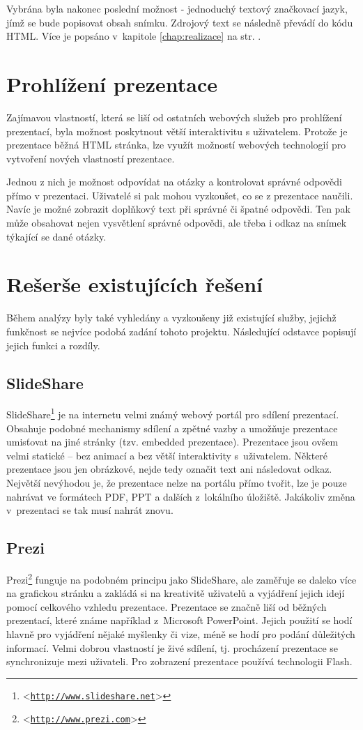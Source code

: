 \documentclass[11pt,twoside,a4paper]{book}
\let\oldUrl\url									%
\renewcommand\url[1]{<\texttt{\oldUrl{#1}}>}
\begin{document}
Vybrána byla nakonec poslední možnost - jednoduchý textový značkovací jazyk, jímž se bude popisovat obsah snímku. Zdrojový text se následně převádí do kódu HTML. Více je popsáno v~kapitole \ref{chap:realizace}  na str. \pageref{chap:realizace}.

\section{Prohlížení prezentace}
Zajímavou vlastností, která se liší od ostatních webových služeb pro prohlížení prezentací, byla možnost poskytnout větší interaktivitu s uživatelem. Protože je prezentace běžná HTML stránka, lze využít možností webových technologií pro vytvoření nových vlastností prezentace.

Jednou z nich je možnost odpovídat na otázky a kontrolovat správné odpovědi přímo v prezentaci. Uživatelé si pak mohou vyzkoušet, co se z prezentace naučili. Navíc je možné zobrazit doplňkový text při správné či špatné odpovědi. Ten pak může obsahovat nejen vysvětlení správné odpovědi, ale třeba i odkaz na snímek týkající se dané otázky.


\section{Rešerše existujících řešení} \label{chap:existujiciSystemy}
Během analýzy byly také vyhledány a vyzkoušeny již existující služby, jejichž funkčnost se nejvíce podobá zadání tohoto projektu. Následující odstavce popisují jejich funkci a rozdíly.


\subsection{SlideShare}
SlideShare\footnote{\url{http://www.slideshare.net}} je na internetu velmi známý webový portál pro sdílení prezentací. Obsahuje podobné mechanismy sdílení a zpětné vazby a umožňuje prezentace umisťovat na jiné stránky (tzv. embedded prezentace). Prezentace jsou ovšem velmi statické – bez animací a bez větší interaktivity s~uživatelem. Některé prezentace jsou jen obrázkové, nejde tedy označit text ani následovat odkaz. Největší nevýhodou je, že prezentace nelze na portálu přímo tvořit, lze je pouze nahrávat ve formátech PDF, PPT a dalších z~lokálního úložiště. Jakákoliv změna v~prezentaci se tak musí nahrát znovu.

\subsection{Prezi}
Prezi\footnote{\url{http://www.prezi.com}} funguje na podobném principu jako SlideShare, ale zaměřuje se daleko více na grafickou stránku a zakládá si na kreativitě uživatelů a vyjádření jejich idejí pomocí celkového vzhledu prezentace. Prezentace se značně liší od běžných prezentací, které známe například z~Microsoft PowerPoint. Jejich použití se hodí hlavně pro vyjádření nějaké myšlenky či vize, méně se hodí pro podání důležitých informací. Velmi dobrou vlastností je živé sdílení, tj. procházení prezentace se synchronizuje mezi uživateli. Pro zobrazení prezentace používá technologii Flash.
\end{document}
